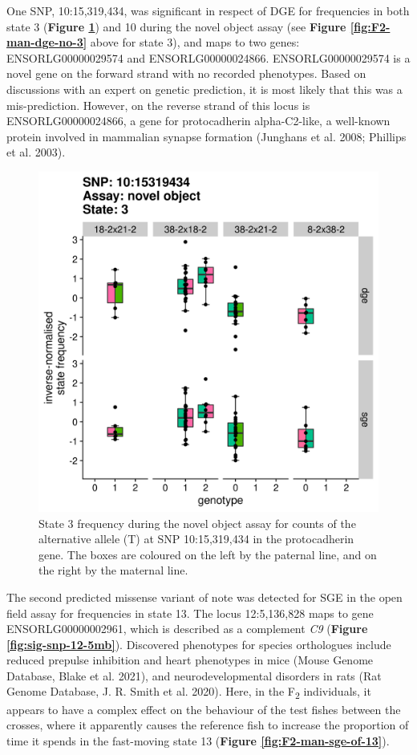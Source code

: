 \documentclass[
]{book}
\begin{document}
One SNP, 10:15,319,434, was significant in respect of DGE for frequencies in both state 3 (\textbf{Figure \ref{fig:sig-snp-10-15mb}}) and 10 during the novel object assay (see \textbf{Figure \ref{fig:F2-man-dge-no-3}} above for state 3), and maps to two genes: ENSORLG00000029574 and ENSORLG00000024866. ENSORLG00000029574 is a novel gene on the forward strand with no recorded phenotypes. Based on discussions with an expert on genetic prediction, it is most likely that this was a mis-prediction. However, on the reverse strand of this locus is ENSORLG00000024866, a gene for protocadherin alpha-C2-like, a well-known protein involved in mammalian synapse formation (Junghans et al. 2008; Phillips et al. 2003).



\begin{figure}

{\centering \includegraphics[width=0.5\linewidth]{figs/mikk_behaviour/sig_snps_boxplots/3-10:15319434} 

}

\caption{State 3 frequency during the novel object assay for counts of the alternative allele (T) at SNP 10:15,319,434 in the protocadherin gene. The boxes are coloured on the left by the paternal line, and on the right by the maternal line.}\label{fig:sig-snp-10-15mb}
\end{figure}

The second predicted missense variant of note was detected for SGE in the open field assay for frequencies in state 13. The locus 12:5,136,828 maps to gene ENSORLG00000002961, which is described as a complement \emph{C9} (\textbf{Figure \ref{fig:sig-snp-12-5mb}}). Discovered phenotypes for species orthologues include reduced prepulse inhibition and heart phenotypes in mice (Mouse Genome Database, Blake et al. 2021), and neurodevelopmental disorders in rats (Rat Genome Database, J. R. Smith et al. 2020). Here, in the F\textsubscript{2} individuals, it appears to have a complex effect on the behaviour of the test fishes between the crosses, where it apparently causes the reference fish to increase the proportion of time it spends in the fast-moving state 13 (\textbf{Figure \ref{fig:F2-man-sge-of-13}}).
\end{document}

